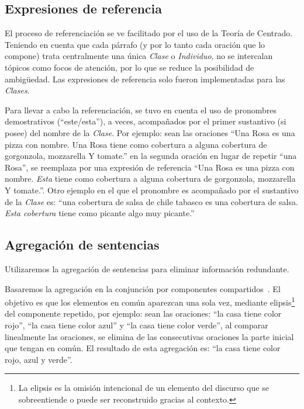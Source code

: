 \subsection{Expresiones de referencia}
\label{sec:expresiones_ref}
El proceso de referenciación se ve facilitado por el uso de la Teoría de Centrado. 
Teniendo en cuenta que cada párrafo (y por lo tanto cada oración que lo compone) trata centralmente una única \textit{Clase }o \textit{Individuo}, no se intercalan tópicos como focos de atención, por lo que se reduce la posibilidad de ambigüedad. Las expresiones de referencia solo fueron implementadas para las \textit{Clases}.

Para llevar a cabo la referenciación, se tuvo en cuenta el uso de pronombres demostrativos (``este/esta''), a veces, acompañados por el primer sustantivo (si posee) del nombre de la \textit{Clase}. Por ejemplo: sean las oraciones ``Una Rosa es una pizza con nombre. Una Rosa tiene como cobertura a alguna cobertura de gorgonzola, mozzarella Y tomate.'' en la segunda oración en lugar de repetir ``una Rosa'', se reemplaza por una expresión de referencia ``Una Rosa es una pizza con nombre. \emph{Esta} tiene como cobertura a alguna cobertura de gorgonzola, mozzarella Y tomate.''. Otro ejemplo en el que el pronombre es acompañado por el sustantivo de la \textit{Clase} es: ``una cobertura de salsa de chile tabasco es una cobertura de salsa. \emph{Esta cobertura} tiene como picante algo muy picante.''


\subsection{Agregación de sentencias}
\label{sec:agregacion}
Utilizaremos la agregación de sentencias para eliminar información redundante.

Basaremos la agregación en la conjunción por componentes compartidos~\cite{bernardos2003marco}. El objetivo es que los elementos en común aparezcan una sola vez, mediante elipsis\footnote{La elipsis es la omisión intencional de un elemento del discurso que se sobreentiende o puede ser reconstruido gracias al contexto.} del componente repetido, por ejemplo: sean las oraciones: ``la casa tiene color rojo'', ``la casa tiene color azul'' y ``la casa tiene color verde'', al comparar linealmente las oraciones, se elimina de las consecutivas oraciones la parte inicial que tengan en común. El resultado de esta agregación es: ``la casa tiene color rojo, azul y verde''.

